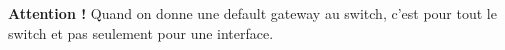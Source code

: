 \documentclass[a4paper]{article}
\begin{document}
\subsection{}





\textbf{Attention !} Quand on donne une default gateway au switch, c'est pour tout le switch et pas seulement pour une interface.
\end{document}
